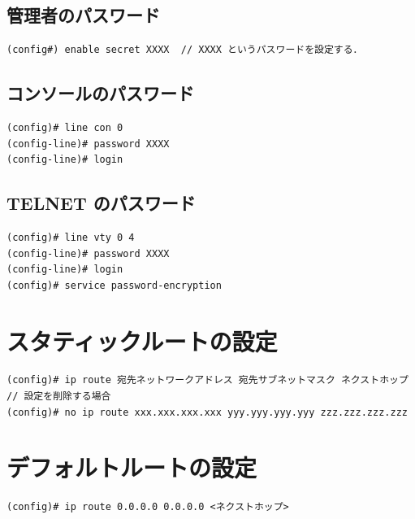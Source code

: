 \documentclass[uplatex,dvipdfmx]{bxjsarticle}
\begin{document}
\subsection{管理者のパスワード}

\begin{lstlisting}[caption={管理者のパスワード}]
(config#) enable secret XXXX  // XXXX というパスワードを設定する．
\end{lstlisting}

\subsection{コンソールのパスワード}

\begin{lstlisting}[caption={コンソールのパスワード}]
(config)# line con 0
(config-line)# password XXXX
(config-line)# login
\end{lstlisting}

\subsection{TELNET のパスワード}

\begin{lstlisting}[caption={TELNET のパスワード}]
(config)# line vty 0 4
(config-line)# password XXXX
(config-line)# login
(config)# service password-encryption
\end{lstlisting}

\section{スタティックルートの設定}

\begin{lstlisting}[caption={スタティックルートの設定}]
(config)# ip route 宛先ネットワークアドレス 宛先サブネットマスク ネクストホップ
// 設定を削除する場合
(config)# no ip route xxx.xxx.xxx.xxx yyy.yyy.yyy.yyy zzz.zzz.zzz.zzz
\end{lstlisting}

\section{デフォルトルートの設定}

\begin{lstlisting}[caption={デフォルトルートの設定}]
(config)# ip route 0.0.0.0 0.0.0.0 <ネクストホップ>

\end{lstlisting}
\end{document}
